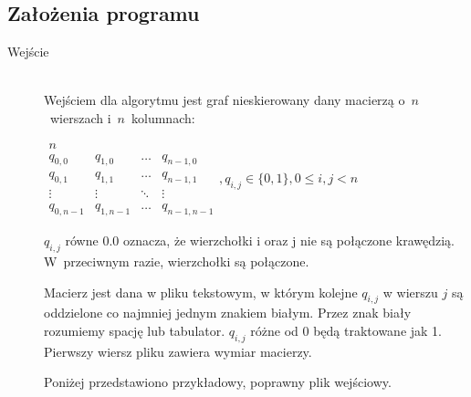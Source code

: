 \documentclass[12pt, a4paper]{article}
\begin{document}
\subsection{Założenia programu}
\begin{description}
	\item[Wejście] \hfill \\
Wejściem dla algorytmu jest graf nieskierowany dany macierzą o~$n$~wierszach i~$n$~kolumnach:

\bigskip
$ 
\begin{array}{cccc}
n \\
q_{0,0} & q_{1,0} & \ldots & q_{n-1,0} \\
q_{0,1} & q_{1,1} & \ldots & q_{n-1,1} \\
\vdots  & \vdots  & \ddots & \vdots  \\
q_{0,n-1} & q_{1,n-1} & \ldots & q_{n-1,n-1} 
\end{array}
, q_{i,j} \in \{0,1\}, 0 \leq i,j < n
$
\bigskip

$q_{i,j}$ równe 0.0 oznacza, że wierzchołki i oraz j nie są połączone krawędzią. W~przeciwnym razie, wierzchołki są połączone.
\par\vspace{\baselineskip}
Macierz jest dana w pliku tekstowym, w którym kolejne $q_{i,j}$ w wierszu $j$ są
oddzielone co najmniej jednym znakiem białym. Przez znak biały rozumiemy
spację lub tabulator. $q_{i,j}$ różne od 0 będą traktowane jak 1. Pierwszy wiersz pliku zawiera wymiar macierzy.

Poniżej przedstawiono przykładowy, poprawny plik wejściowy.


\end{description}
\end{document}
